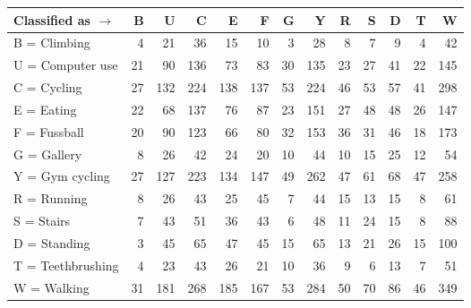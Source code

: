 \begin{tabular}{lrrrrrrrrrrrr}
\toprule
Classified as $\rightarrow$ &   B &    U &    C &    E &    F &   G &    Y &   R &   S &   D &   T &    W \\
\midrule
B = Climbing      &   4 &   21 &   36 &   15 &   10 &   3 &   28 &   8 &   7 &   9 &   4 &   42 \\
U = Computer use  &  21 &   90 &  136 &   73 &   83 &  30 &  135 &  23 &  27 &  41 &  22 &  145 \\
C = Cycling       &  27 &  132 &  224 &  138 &  137 &  53 &  224 &  46 &  53 &  57 &  41 &  298 \\
E = Eating        &  22 &   68 &  137 &   76 &   87 &  23 &  151 &  27 &  48 &  48 &  26 &  147 \\
F = Fussball      &  20 &   90 &  123 &   66 &   80 &  32 &  153 &  36 &  31 &  46 &  18 &  173 \\
G = Gallery       &   8 &   26 &   42 &   24 &   20 &  10 &   44 &  10 &  15 &  25 &  12 &   54 \\
Y = Gym cycling   &  27 &  127 &  223 &  134 &  147 &  49 &  262 &  47 &  61 &  68 &  47 &  258 \\
R = Running       &   8 &   26 &   43 &   25 &   45 &   7 &   44 &  15 &  13 &  15 &   8 &   61 \\
S = Stairs        &   7 &   43 &   51 &   36 &   43 &   6 &   48 &  11 &  24 &  15 &   8 &   88 \\
D = Standing      &   3 &   45 &   65 &   47 &   45 &  15 &   65 &  13 &  21 &  26 &  15 &  100 \\
T = Teethbrushing &   4 &   23 &   43 &   26 &   21 &  10 &   36 &   9 &   6 &  13 &   7 &   51 \\
W = Walking       &  31 &  181 &  268 &  185 &  167 &  53 &  284 &  50 &  70 &  86 &  46 &  349 \\
\bottomrule
\end{tabular}
